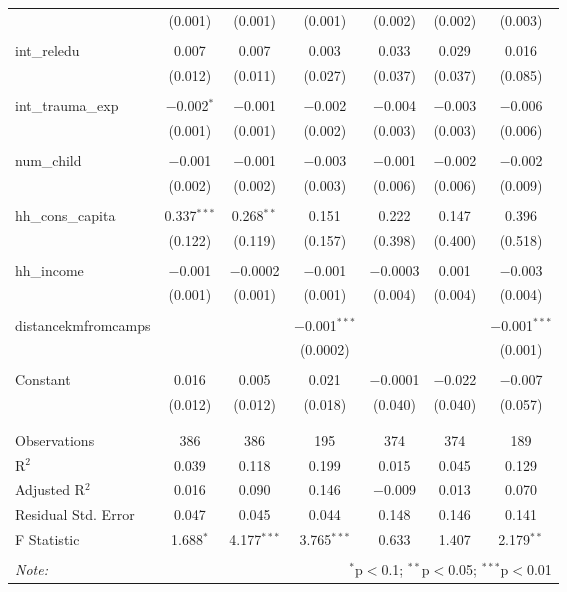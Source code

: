 \begin{table}[H]
\begin{tabular}{@{\extracolsep{4pt}}lcccccc}
  & (0.001) & (0.001) & (0.001) & (0.002) & (0.002) & (0.003) \\ 
  & & & & & & \\ 
 int\_reledu & 0.007 & 0.007 & 0.003 & 0.033 & 0.029 & 0.016 \\ 
  & (0.012) & (0.011) & (0.027) & (0.037) & (0.037) & (0.085) \\ 
  & & & & & & \\ 
 int\_trauma\_exp & $-$0.002$^{*}$ & $-$0.001 & $-$0.002 & $-$0.004 & $-$0.003 & $-$0.006 \\ 
  & (0.001) & (0.001) & (0.002) & (0.003) & (0.003) & (0.006) \\ 
  & & & & & & \\ 
 num\_child & $-$0.001 & $-$0.001 & $-$0.003 & $-$0.001 & $-$0.002 & $-$0.002 \\ 
  & (0.002) & (0.002) & (0.003) & (0.006) & (0.006) & (0.009) \\ 
  & & & & & & \\ 
 hh\_cons\_capita & 0.337$^{***}$ & 0.268$^{**}$ & 0.151 & 0.222 & 0.147 & 0.396 \\ 
  & (0.122) & (0.119) & (0.157) & (0.398) & (0.400) & (0.518) \\ 
  & & & & & & \\ 
 hh\_income & $-$0.001 & $-$0.0002 & $-$0.001 & $-$0.0003 & 0.001 & $-$0.003 \\ 
  & (0.001) & (0.001) & (0.001) & (0.004) & (0.004) & (0.004) \\ 
  & & & & & & \\ 
 distancekmfromcamps &  &  & $-$0.001$^{***}$ &  &  & $-$0.001$^{***}$ \\ 
  &  &  & (0.0002) &  &  & (0.001) \\ 
  & & & & & & \\ 
 Constant & 0.016 & 0.005 & 0.021 & $-$0.0001 & $-$0.022 & $-$0.007 \\ 
  & (0.012) & (0.012) & (0.018) & (0.040) & (0.040) & (0.057) \\ 
  & & & & & & \\ 
\hline \\[-1.8ex] 
Observations & 386 & 386 & 195 & 374 & 374 & 189 \\ 
R$^{2}$ & 0.039 & 0.118 & 0.199 & 0.015 & 0.045 & 0.129 \\ 
Adjusted R$^{2}$ & 0.016 & 0.090 & 0.146 & $-$0.009 & 0.013 & 0.070 \\ 
Residual Std. Error & 0.047 & 0.045 & 0.044 & 0.148 & 0.146 & 0.141 \\ 
F Statistic & 1.688$^{*}$ & 4.177$^{***}$ & 3.765$^{***}$ & 0.633 & 1.407 & 2.179$^{**}$ \\ 
\hline 
\hline \\[-1.8ex] 
\textit{Note:}  & \multicolumn{6}{r}{$^{*}$p$<$0.1; $^{**}$p$<$0.05; $^{***}$p$<$0.01} \\ 
\end{tabular} 
\end{table} 
